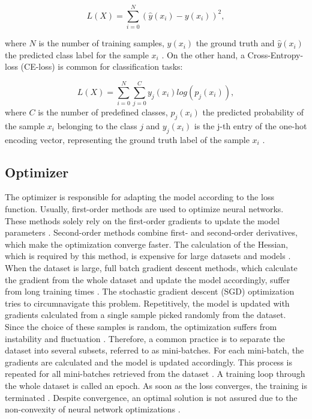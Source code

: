 \begin{equation}
L(X) =  \sum_{i=0}^{N}(\hat{y}(x_{i})-y(x_{i}))^2,
\end{equation}

where $N$ is the number of training samples, $y(x_{i})$ the ground truth and $\hat{y}(x_{i})$ the predicted class label for the sample $x_{i}$ \cite{Calin2020}. On the other hand, a Cross-Entropy-loss (CE-loss) is common for classification tasks: 

\begin{equation}
L(X) = \sum_{i=0}^{N} \sum_{j=0}^{C} y_{j}(x_{i}) log(p_{j}(x_{i})),
\end{equation}
where $C$ is the number of predefined classes, $p_{j}(x_{i})$ the predicted probability of the sample $x_{i}$ belonging to the class $j$ and $y_{j}(x_{i})$ is the j-th entry of the one-hot encoding vector, representing the ground truth label of the sample $x_{i}$ \cite{ShilohPerl2020}.



\subsection{Optimizer}
The optimizer is responsible for adapting the model according to the loss function. Usually, first-order methods are used to optimize neural networks. These methods solely rely on the first-order gradients to update the model parameters \cite{ShilohPerl2020}. Second-order methods combine first- and second-order derivatives, which make the optimization converge faster. The calculation of the Hessian, which is required by this method, is expensive for large datasets and models \cite{Calin2020}\cite{ShilohPerl2020}. When the dataset is large, full batch gradient descent methods, which calculate the gradient from the whole dataset and update the model accordingly, suffer from long training times \cite{ShilohPerl2020}. The stochastic gradient descent (SGD) optimization tries to circumnavigate this problem. Repetitively, the model is updated with gradients calculated from a single sample picked randomly from the dataset. Since the choice of these samples is random, the optimization suffers from instability and fluctuation \cite{ShilohPerl2020}. Therefore, a common practice is to separate the dataset into several subsets, referred to as mini-batches. For each mini-batch, the gradients are calculated and the model is updated accordingly. This process is repeated for all mini-batches retrieved from the dataset \cite{ShilohPerl2020}. A training loop through the whole dataset is called an epoch. As soon as the loss converges, the training is terminated \cite{ShilohPerl2020}. Despite convergence, an optimal solution is not assured due to the non-convexity of neural network optimizations \cite{ShilohPerl2020}.

